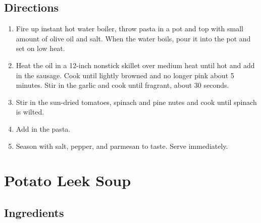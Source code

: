 \documentclass[letterpaper,10pt,english]{sphinxmanual}
\begin{document}
\section{Directions}
\label{\detokenize{Pine_Nut_Pasta:directions}}\begin{enumerate}
\item {} 
Fire up instant hot water boiler, throw pasta in a pot and top with small amount of olive oil and salt.  When the water boils, pour it into the pot and set on low heat.

\item {} 
Heat the oil in a 12-inch nonstick skillet over medium heat until hot and add in the sausage. Cook until lightly browned and no longer pink about 5 minutes. Stir in the garlic and cook until fragrant, about 30 seconds.

\item {} 
Stir in the sun-dried tomatoes, spinach and pine nutes and cook until spinach is wilted.

\item {} 
Add in the pasta.

\item {} 
Season with salt, pepper, and parmesan to taste.  Serve immediately.

\end{enumerate}


\chapter{Potato Leek Soup}
\label{\detokenize{Potato_Leek_Soup:potato-leek-soup}}\label{\detokenize{Potato_Leek_Soup::doc}}

\section{Ingredients}
\label{\detokenize{Potato_Leek_Soup:ingredients}}
%
\begin{sphinxVerbatim}[commandchars=\\\{\}]
  

            

        

   

   

    

     

    
\end{sphinxVerbatim}
\end{document}
